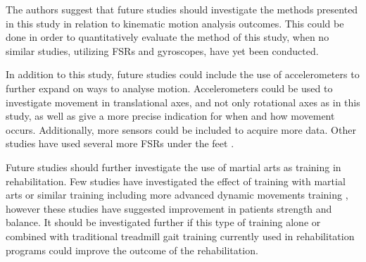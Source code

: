 The authors suggest that future studies should investigate the methods presented in this study in relation to kinematic motion analysis outcomes. This could be done in order to quantitatively evaluate the method of this study, when no similar studies, utilizing FSRs and gyroscopes, have yet been conducted. 

In addition to this study, future studies could include the use of accelerometers to further expand on ways to analyse motion. Accelerometers could be used to investigate movement in translational axes, and not only rotational axes as in this study, as well as give a more precise indication for when and how movement occurs. Additionally, more sensors could be included to acquire more data. Other studies have used several more FSRs under the feet \cite{Hessert2005, Hu2018}.

Future studies should further investigate the use of martial arts as training in rehabilitation. Few studies have investigated the effect of training with martial arts or similar training including more advanced dynamic movements training \cite{Winser2018, Ding2012}, however these studies have suggested improvement in patients strength and balance. It should be investigated further if this type of training alone or combined with traditional treadmill gait training currently used in rehabilitation programs could improve the outcome of the rehabilitation.








